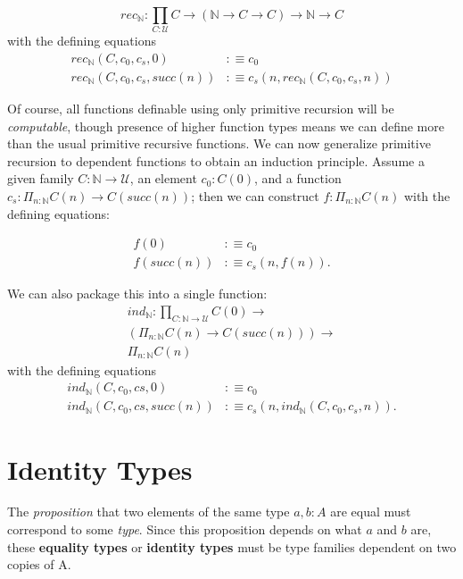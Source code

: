 \documentclass[letterpaper, 10 pt, conference]{ieeeconf}  %
\begin{document}
\begin{equation}
    rec_{\mathbb{N}}: \prod_{C : \mathcal{U}} C \rightarrow (\mathbb{N} \rightarrow C \rightarrow C) \rightarrow \mathbb{N} \rightarrow C
\end{equation}
with the defining equations 
\begin{align}
    rec_{\mathbb{N}}(C,c_0,c_s,0) & :\equiv c_0 \\
    rec_{\mathbb{N}}(C,c_0,c_s, succ(n)) & :\equiv c_s(n, rec_{\mathbb{N}}(C,c_0,c_s,n))
\end{align}

Of course, all functions definable using only primitive recursion will be \textit{computable}, though presence of higher function types means we can define more than the usual primitive recursive functions. We can now generalize primitive recursion to dependent functions to obtain an induction principle. Assume a given family $C :\mathbb{N} \rightarrow \mathcal{U} $, an element $c_0 : C(0)$, and a function $c_s : \Pi_{n:\mathbb{N}} C(n) \rightarrow C(succ(n))$; then we can construct $f : \Pi_{n:\mathbb{N}} C(n)$ with the defining equations:

\begin{align}
    f(0) & :\equiv c_0 \\
    f(succ(n)) & :\equiv c_s(n,f(n)).
\end{align}

We can also package this into a single function:
\begin{multline}
    ind_{\mathbb{N}} : \prod_{C:\mathbb{N} \rightarrow \mathcal{U}} C(0) \rightarrow \\ (\Pi_{n : \mathbb{N}} C(n) \rightarrow C(succ(n))) \rightarrow \\ \Pi_{n:\mathbb{N}} C(n)
\end{multline}
with the defining equations
\begin{align}
    ind_{\mathbb{N}}(C, c_0,cs,0) & :\equiv c_0 \\
    ind_{\mathbb{N}}(C, c_0,cs,succ(n)) & :\equiv c_s(n,ind_{\mathbb{N}}(C,c_0,c_s,n)).
\end{align}


\section{Identity Types}

The \textit{proposition} that two elements of the same type $a,b : A$ are equal must correspond to some \textit{type}. Since this proposition depends on what $a$ and $b$ are, these \textbf{equality types} or \textbf{identity types} must be type families dependent on two copies of A. 
\end{document}
